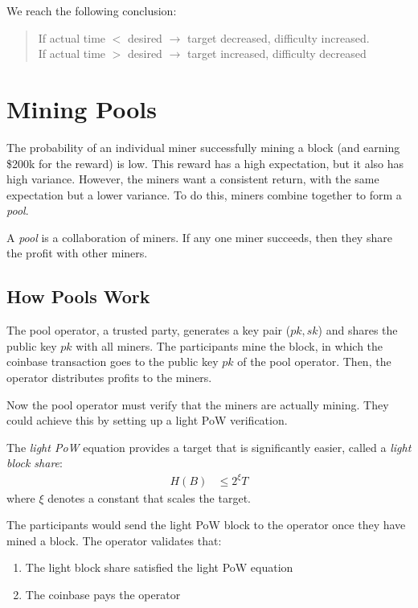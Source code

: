We reach the following conclusion:
\begin{quote}
If actual time $<$ desired $\longrightarrow$ target decreased, difficulty increased.\\
If actual time $>$ desired $\longrightarrow$ target increased, difficulty decreased
\end{quote}

\section{Mining Pools}
The probability of an individual miner successfully mining a block (and earning \$200k for the reward) is low. This reward has a high expectation, but it also has high variance. However, the miners want a consistent return, with the same expectation but a lower variance. To do this, miners combine together to form a \textit{pool}.

\begin{definition}
A \textit{pool} is a collaboration of miners. If any one miner succeeds, then they share the profit with other miners.
\end{definition}

\subsection{How Pools Work}
The pool operator, a trusted party, generates a key pair ($pk, sk$) and shares the public key $pk$ with all miners. The participants mine the block, in which the coinbase transaction goes to the public key $pk$ of the pool operator. Then, the operator distributes profits to the miners.

Now the pool operator must verify that the miners are actually mining. They could achieve this by setting up a light PoW verification.
\begin{definition}
The \textit{light PoW} equation provides a target that is significantly easier, called a \textit{light block share}:
\begin{align*}
H(B) &\leq 2^\xi T
\end{align*}
where $\xi$ denotes a constant that scales the target.
\end{definition}
The participants would send the light PoW block to the operator once they have mined a block. The operator validates that:
\begin{enumerate}
    \item The light block share satisfied the light PoW equation
    \item The coinbase pays the operator\end{enumerate}

